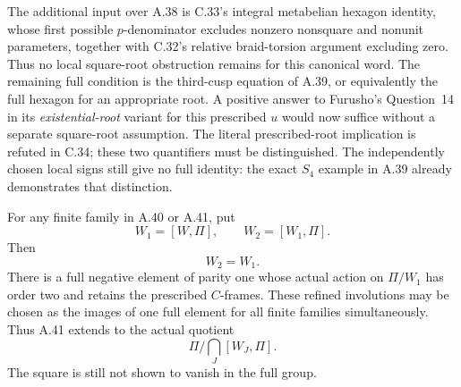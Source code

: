 The additional input over A.38 is C.33's integral
metabelian hexagon identity, whose first possible
\(p\)-denominator excludes nonzero nonsquare
and nonunit parameters, together with C.32's
relative braid-torsion argument excluding zero.
Thus no local square-root obstruction remains
for this canonical word. The remaining full
condition is the third-cusp equation of A.39,
or equivalently the full hexagon for an appropriate
root. A positive answer to Furusho's Question~14
in its \emph{existential-root} variant for this
prescribed \(u\) would now suffice without a
separate square-root assumption. The literal
prescribed-root implication is refuted in C.34;
these two quantifiers must be distinguished.
The independently chosen local signs still give
no full identity: the exact \(S_4\) example
in A.39 already demonstrates that distinction.

For any finite family in A.40 or A.41, put
\[
       W_1=[W,\Pi],\qquad W_2=[W_1,\Pi].
\]
Then
\[
                         W_2=W_1.
 \tag{A.43.1}
\]
There is a full negative element of parity one
whose actual action on \(\Pi/W_1\) has order
two and retains the prescribed \(C\)-frames.
These refined involutions may be chosen as the
images of one full element for all finite
families simultaneously. Thus A.41 extends to
the actual quotient
\[
            \Pi\Big/\bigcap_J[W_J,\Pi].
 \tag{A.43.2}
\]
The square is still not shown to vanish in the
full group.

